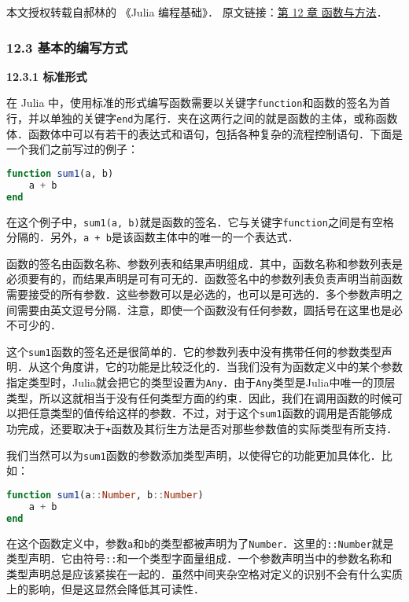 
本文授权转载自郝林的 《Julia 编程基础》． 原文链接：\href{https://github.com/hyper0x/JuliaBasics/blob/master/book/ch11.md}{第 12 章 函数与方法}．

\subsubsection{12.3 基本的编写方式}

\textbf{12.3.1 标准形式}

在 Julia 中，使用标准的形式编写函数需要以关键字\verb|function|和函数的签名为首行，并以单独的关键字\verb|end|为尾行．夹在这两行之间的就是函数的主体，或称函数体．函数体中可以有若干的表达式和语句，包括各种复杂的流程控制语句．下面是一个我们之前写过的例子：

\begin{lstlisting}[language=julia]
function sum1(a, b)
    a + b
end
\end{lstlisting}

在这个例子中，\verb|sum1(a, b)|就是函数的签名．它与关键字\verb|function|之间是有空格分隔的．另外，\verb|a + b|是该函数主体中的唯一的一个表达式．

函数的签名由函数名称、参数列表和结果声明组成．其中，函数名称和参数列表是必须要有的，而结果声明是可有可无的．函数签名中的参数列表负责声明当前函数需要接受的所有参数．这些参数可以是必选的，也可以是可选的．多个参数声明之间需要由英文逗号分隔．注意，即使一个函数没有任何参数，圆括号在这里也是必不可少的．

这个\verb|sum1|函数的签名还是很简单的．它的参数列表中没有携带任何的参数类型声明．从这个角度讲，它的功能是比较泛化的．当我们没有为函数定义中的某个参数指定类型时，Julia就会把它的类型设置为\verb|Any|．由于\verb|Any|类型是Julia中唯一的顶层类型，所以这就相当于没有任何类型方面的约束．因此，我们在调用函数的时候可以把任意类型的值传给这样的参数．不过，对于这个\verb|sum1|函数的调用是否能够成功完成，还要取决于\verb|+|函数及其衍生方法是否对那些参数值的实际类型有所支持．

我们当然可以为\verb|sum1|函数的参数添加类型声明，以使得它的功能更加具体化．比如：

\begin{lstlisting}[language=julia]
function sum1(a::Number, b::Number)
    a + b
end
\end{lstlisting}

在这个函数定义中，参数\verb|a|和\verb|b|的类型都被声明为了\verb|Number|．这里的\verb|::Number|就是类型声明．它由符号\verb|::|和一个类型字面量组成．一个参数声明当中的参数名称和类型声明总是应该紧挨在一起的．虽然中间夹杂空格对定义的识别不会有什么实质上的影响，但是这显然会降低其可读性．

